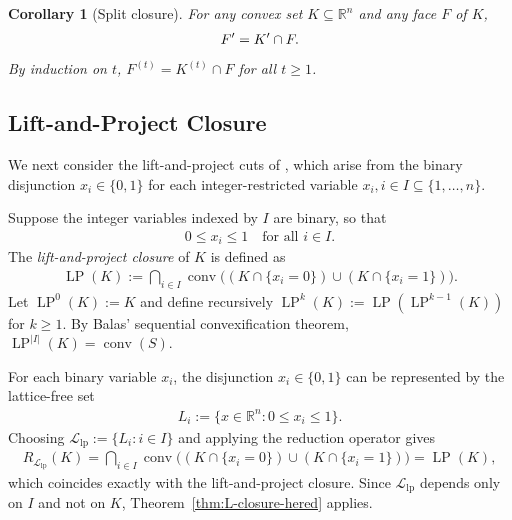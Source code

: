 \documentclass{article}
\newtheorem{corollary}{Corollary}
\newcommand{\R}{\mathbb{R}}
\renewcommand{\L}{\mathcal{L}}
\begin{document}
\begin{corollary}[Split closure] \label{cor:split-hered}
    For any  convex set $K \subseteq \R^n$ and any face $F$ of $K$,
    \begin{align}
        F' = K' \cap F. \notag
    \end{align}
    By induction on $t$, $F^{(t)} = K^{(t)} \cap F$ for all $t \geq 1$.
\end{corollary}

\subsection{Lift-and-Project Closure} \label{sec:lift-project}

We next consider the lift-and-project cuts of \cite{balas1993lift}, which arise from the binary disjunction $x_i \in \{0,1\}$ for each integer-restricted variable $x_i, i \in I \subseteq \{ 1, \ldots, n \}$.

Suppose the integer variables indexed by $I$ are binary, so that
\begin{align}
    0 \leq x_i \leq 1 \quad \text{for all } i \in I.
\end{align}
The \emph{lift-and-project closure} of $K$ is defined as
\begin{align}
    \operatorname{LP}(K) := \bigcap_{i \in I}
    \operatorname{conv}\big((K \cap \{x_i = 0\}) \cup (K \cap \{x_i = 1\})\big).
\end{align}
Let $\operatorname{LP}^0(K) := K$ and define recursively $\operatorname{LP}^{k}(K) := \operatorname{LP}(\operatorname{LP}^{k-1}(K))$ for $k \geq 1$.
By Balas' sequential convexification theorem, $\operatorname{LP}^{|I|}(K) = \operatorname{conv}(S)$.


For each binary variable $x_i$, the disjunction $x_i \in \{0,1\}$ can be represented by the lattice-free set
\begin{align}
    L_i := \{x \in \R^n : 0 \leq x_i \leq 1\}.
\end{align}
Choosing $\L_{\mathrm{lp}} := \{L_i : i \in I\}$ and applying the reduction operator gives
\begin{align}
    R_{\L_{\mathrm{lp}}}(K) = \bigcap_{i \in I} \operatorname{conv}\big((K \cap \{x_i = 0\}) \cup (K \cap \{x_i = 1\})\big) = \operatorname{LP}(K),
\end{align}
which coincides exactly with the lift-and-project closure. Since $\L_{\mathrm{lp}}$ depends only on $I$ and not on $K$, Theorem~\ref{thm:L-closure-hered} applies.
\end{document}
